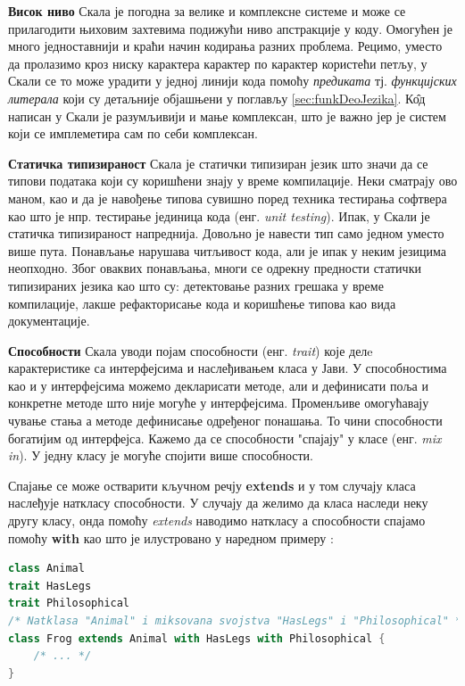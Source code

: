 \documentclass[12pt,oneside]{memoir}
\begin{document}
\begin{description}
\item \textbf{Висок ниво} Скала је погодна за велике и комплексне системе и може се прилагодити њиховим захтевима подижући ниво апстракције у коду. Омогућен је много једноставнији и краћи начин кодирања разних проблема. Рецимо, уместо да пролазимо кроз ниску карактера карактер по карактер користећи петљу, у Скали се то може урадити у једној линији кода помоћу \textit{предиката} тј.  \textit{функцијских литерала} који су детаљније објашњени у поглављу \ref{sec:funkDeoJezika}. К\^{о}д написан у Скали је разумљивији и мање комплексан, што је важно јер је систем који се имплеметира сам по себи комплексан.

\item \textbf{Статичка типизираност} Скала је статички типизиран језик што значи да се типови података који су коришћени знају у време компилације. Неки сматрају ово маном, као и да је навођење типова сувишно поред техника тестирања софтвера као што је нпр. тестирање јединица кода (енг. \textit{unit testing}). Ипак, у Скали је статичка типизираност напреднија. Довољно је навести тип само једном уместо више пута. Понављање нарушава читљивост кода, али је ипак у неким језицима неопходно. Због оваквих понављања, многи се одрекну предности статички типизираних језика као што су: детектовање разних грешака у време компилације, лакше рефакторисање кода и коришћење типова као вида документације.

\item \textbf{Способности} Скала уводи појам способности (енг. \textit{trait}) које делe карактеристике са интерфејсима и наслеђивањем класа у Јави. У способностима као и у интерфејсима можемо декларисати методе, али и дефинисати поља и конкретне методе што није могуће у интерфејсима. Променљиве омогућавају чување стања а методе дефинисање одређеног понашања. То чини способности богатијим од интерфејса. Кажемо да се способности "спајају" у класе (енг. \textit{mix in}). У једну класу је могуће спојити више способности.

Спајање се може остварити кључном речју \textbf{extends} и у том случају класа наслеђује наткласу способности. У случају да желимо да класа наследи неку другу класу, онда помоћу \textit{extends} наводимо наткласу а способности спајамо помоћу \textbf{with} као што је илустровано у наредном примеру \cite{progInScala}: 

\begin{lstlisting}[language=Scala]
class Animal
trait HasLegs
trait Philosophical
/* Natklasa "Animal" i miksovana svojstva "HasLegs" i "Philosophical" */
class Frog extends Animal with HasLegs with Philosophical {
	/* ... */
}
\end{lstlisting}


\end{description}
\end{document}
